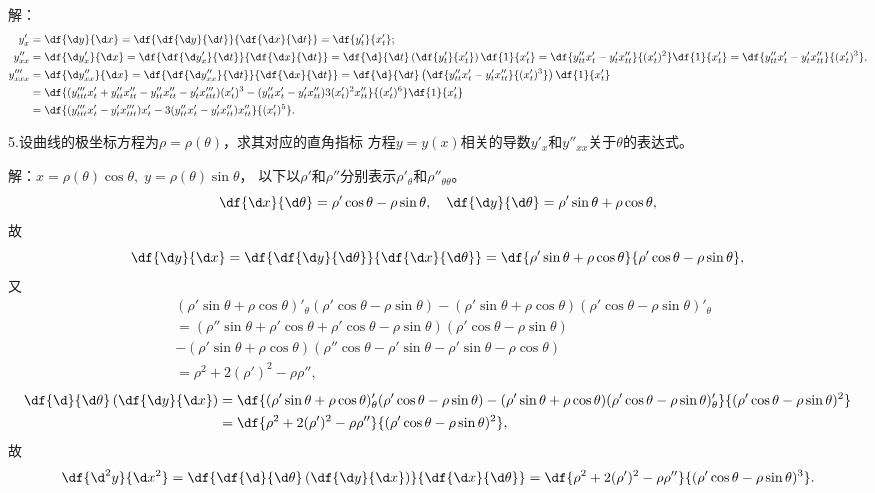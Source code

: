 解：
\begin{align*}
	y'_x&=\df{\d y}{\d x}=\df{\df{\d y}{\d t}}{\df{\d x}{\d t}}
	=\df{y'_t}{x'_t};\\
	y''_{xx}&=\df{\d y'_x}{\d x}=\df{\df{\d y'_x}{\d t}}{\df{\d x}{\d t}}
	=\df{\d }{\d t}\left(\df{y'_t}{x'_t}\right)\df{1}{x'_t}
	=\df{y''_{tt}x'_t-y'_tx''_{tt}}{(x'_t)^2}\df{1}{x'_t}
	=\df{y''_{tt}x'_t-y'_tx''_{tt}}{(x'_t)^3},\\
	y'''_{xxx}&=\df{\d y''_{xx}}{\d x}=\df{\df{\d y''_{xx}}{\d t}}{\df{\d x}{\d t}}
	=\df{\d }{\d t}\left(\df{y''_{tt}x'_t-y'_tx''_{tt}}{(x'_t)^3}\right)
	\df{1}{x'_t}\\
	&=\df{(y'''_{ttt}x'_t+y''_{tt}x''_{tt}
	-y''_{tt}x''_{tt}-y'_tx'''_{ttt})(x'_t)^3
	-(y''_{tt}x'_t-y'_tx''_{tt})3(x'_t)^2x''_{tt}}{(x'_t)^6}\df{1}{x'_t}\\
	&=\df{(y'''_{ttt}x'_t-y'_tx'''_{ttt})x'_t
	-3(y''_{tt}x'_t-y'_tx''_{tt})x''_{tt}}{(x'_t)^5}.
\end{align*}
\fin

\bigskip

5.设曲线的极坐标方程为$\rho=\rho(\theta)$，求其对应的直角指标
方程$y=y(x)$相关的导数$y'_x$和$y''_{xx}$关于$\theta$的表达式。

解：$x=\rho(\theta)\cos\theta,\;y=\rho(\theta)\sin\theta$，
以下以$\rho'$和$\rho''$分别表示$\rho'_{\theta}$和$\rho''_{\theta\theta}$。
$$\df{\d x}{\d\theta}=\rho'\cos\theta-\rho\sin\theta,
\quad
\df{\d y}{\d\theta}=\rho'\sin\theta+\rho\cos\theta,$$
故
$$\df{\d y}{\d x}=\df{\df{\d y}{\d\theta}}{\df{\d x}{\d\theta}}
=\df{\rho'\sin\theta+\rho\cos\theta}{\rho'\cos\theta-\rho\sin\theta},$$
又
\begin{align*}
	&(\rho'\sin\theta+\rho\cos\theta)'_{\theta}(\rho'\cos\theta-\rho\sin\theta)
	-(\rho'\sin\theta+\rho\cos\theta)(\rho'\cos\theta-\rho\sin\theta)'_{\theta}\\
	&=(\rho''\sin\theta+\rho'\cos\theta+\rho'\cos\theta-\rho\sin\theta)
	(\rho'\cos\theta-\rho\sin\theta)\\
	&-(\rho'\sin\theta+\rho\cos\theta)
	(\rho''\cos\theta-\rho'\sin\theta-\rho'\sin\theta-\rho\cos\theta)\\
	&=\rho^2+2(\rho')^2-\rho\rho'',
\end{align*}
\begin{align*}
	\df{\d}{\d\theta}\left(\df{\d y}{\d x}\right)
	&=\df{(\rho'\sin\theta+\rho\cos\theta)'_{\theta}(\rho'\cos\theta-\rho\sin\theta)
	-(\rho'\sin\theta+\rho\cos\theta)(\rho'\cos\theta-\rho\sin\theta)'_{\theta}}
	{(\rho'\cos\theta-\rho\sin\theta)^2}\\
	&=\df{\rho^2+2(\rho')^2-\rho\rho''}{(\rho'\cos\theta-\rho\sin\theta)^2},
\end{align*}
故
$$
\df{\d^2y}{\d x^2}
=\df{\df{\d}{\d\theta}\left(\df{\d y}{\d x}\right)}{\df{\d x}{\d\theta}}
=\df{\rho^2+2(\rho')^2-\rho\rho''}{(\rho'\cos\theta-\rho\sin\theta)^3}.
$$
\fin

